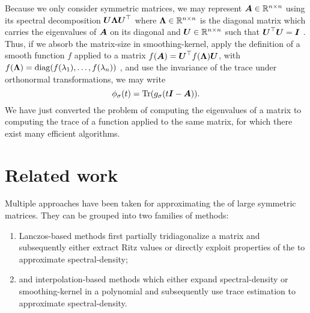 Because we only consider symmetric matrices, 
we may represent $\boldsymbol{A} \in \mathbb{R}^{n \times n}$ using its spectral
decomposition $\boldsymbol{U} \boldsymbol{\Lambda} \boldsymbol{U}^{\top}$ where
$\boldsymbol{\Lambda} \in \mathbb{R}^{n \times n}$ is the diagonal matrix which carries
the eigenvalues of $\boldsymbol{A}$ on its diagonal and $\boldsymbol{U} \in \mathbb{R}^{n \times n}$
such that $\boldsymbol{U}^{\top} \boldsymbol{U} = \boldsymbol{I}$ \cite[Theorem~4.1.5]{horn1985matrix}.
Thus, if we absorb the \gls{matrix-size} in \gls{smoothing-kernel},
apply the definition of a smooth function $f$ applied to a matrix $f(\boldsymbol{A}) = \boldsymbol{U}^{\top} f(\boldsymbol{\Lambda}) \boldsymbol{U}$,
with $f(\boldsymbol{\Lambda}) = \operatorname{diag}(f(\lambda_1), \dots, f(\lambda_n))$ \cite[Definition~1.2]{higham2008functions},
and use the invariance of the trace under orthonormal transformations, we may write
\begin{equation}
    \phi_{\sigma}(t) = \operatorname{Tr}(g_{\sigma}(t\boldsymbol{I} - \boldsymbol{A})).
    \label{equ:1-introduction-spectral-density-as-trace}
\end{equation}
We have just converted the problem of computing the eigenvalues of a matrix to 
computing the trace of a function applied to the same matrix, for which
there exist many efficient algorithms.


\section{Related work}
\label{sec:1-introduction-related}

Multiple approaches have been taken for approximating the 
of large symmetric matrices.
They can be grouped into two families of methods:

\begin{enumerate}
    \item Lanczos-based methods
    first partially tridiagonalize a matrix and subsequently either extract Ritz values
    \cite{lin2016review, chen2021slq} or directly exploit properties of the
     \cite{haydock1972electronic, lin2016review}
    to approximate \gls{spectral-density};
    \item and interpolation-based methods which either expand
    \gls{spectral-density} \cite{weisse2006kpm} or \gls{smoothing-kernel}
    \cite{lin2016review,lin2017randomized} in a polynomial and subsequently
    use trace estimation to approximate \gls{spectral-density}.
\end{enumerate}

